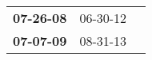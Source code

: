 \begin{supertabular}{p{0.33\columnwidth}p{0.33\columnwidth}p{0.33\columnwidth}}
 \textbf{07-26-08\textsuperscript{}} &  06-30-12\textsuperscript{} \\
 \textbf{07-07-09\textsuperscript{}} &  08-31-13\textsuperscript{} \\
\end{supertabular}
